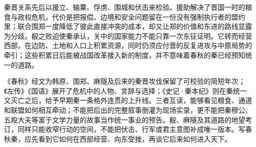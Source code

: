 \begin{turningpoint}
秦晋关系先后以援立、输粟、俘虏、围城和伏击来检验。援助解决了晋国一时的粮食与政权危机，代价是把报偿、边境和安全问题留在一份没有强制执行者的盟约里；联合围郑一度降低了彼此直接冲突的成本，却又让郑的价值和东进的路线显露为分歧。殽之败迫使秦承认，关中的国家能力不能只靠一次东征证明。它转而经营西部，在边防、土地和人口上积累资源，同时仍须应付晋的反复进攻与中原局势的牵引；这些积累日后能被战国改革接入新的制度，并不意味着春秋的秦已经预知统一的道路。
\end{turningpoint}

\begin{sourcenote}[秦早期的叙事陷阱]
《春秋》经文为韩原、围郑、麻隧及后来的秦晋攻伐保留了可校验的简短年次；《左传》《国语》展开了危机中的人物、言辞与选择；《史记·秦本纪》则在秦统一又灭亡之后，给予早期秦一条格外连贯的上升线。三者互读，能够看见粮食、通道和联盟如何相互牵动；不能把后出的完整叙事倒灌为现场实录，更不能把秦穆公、五羖大夫等富于文学力量的故事当作统一事业的预告。殽、麻隧及其道路的地望考订，同样只能收窄行动的空间，不能把伏击、行军或君主意图补成唯一版本。写春秋秦，应先看到它如何在西部经营、向东受挫，再谈它后来如何进入天下。
\end{sourcenote}
